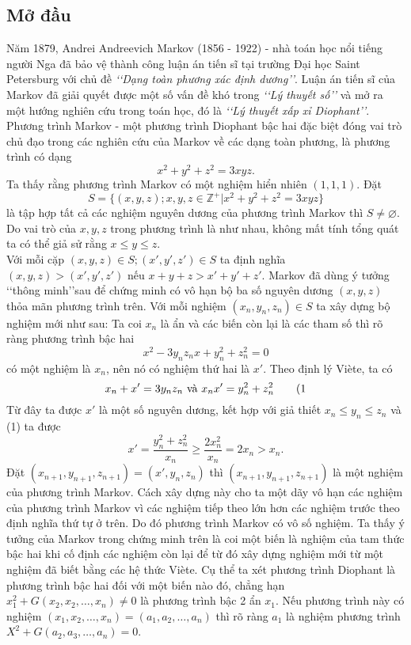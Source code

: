 \subsection{Mở đầu}
Năm 1879, Andrei Andreevich Markov (1856 - 1922) - nhà toán học nổi tiếng người Nga đã bảo vệ thành công luận án tiến sĩ tại trường Đại học Saint Petersburg với chủ đề \textit{{\lq\lq Dạng toàn phương xác định dương\rq\rq}}. Luận án tiến sĩ của Markov đã giải quyết được một số vấn đề khó trong  \textit{{\lq\lq Lý thuyết số\rq\rq}} và mở ra một hướng nghiên cứu trong toán học, đó là \textit{{\lq\lq Lý thuyết xấp xỉ Diophant\rq\rq}}. Phương trình Markov - một phương trình Diophant bậc hai đặc biệt đóng vai trò chủ đạo trong các nghiên cứu của Markov về các dạng toàn phương, là phương trình có dạng 
\[x^2+y^2+z^2=3xyz.\]
Ta thấy rằng phương trình Markov có một nghiệm hiển nhiên $(1,1,1)$. Đặt 
\[S=\{(x,y,z); x,y,z\in \mathbb{Z}^+| x^2+y^2+z^2=3xyz\}\]
là tập hợp tất cả các nghiệm nguyên dương của phương trình Markov thì $S\neq \varnothing.$ Do vai trò của $x,y,z$ trong phương trình là như nhau, không mất tính tổng quát ta có thể giả sử rằng $x\leq y\leq z.$\\
Với mỗi cặp $(x,y,z)\in S; (x', y', z')\in S$ ta định nghĩa $(x,y,z)>(x', y', z')$ nếu $x+y+z>x'+y'+z'.$ Markov đã dùng ý tưởng \lq\lq thông minh\rq\rq sau để chứng minh có vô hạn bộ ba số nguyên dương $(x,y,z)$ thỏa mãn phương trình trên. Với mỗi nghiệm $(x_n, y_n,z_n)\in S$ ta xây dựng bộ nghiệm mới như sau: Ta coi $x_n$ là ẩn và các biến còn lại là các tham số thì rõ ràng phương trình bậc hai
\[x^2- 3y_nz_n x+y_n^2+z_n^2=0\]
có một nghiệm là $x_n$, nên nó có nghiệm thứ hai là $x'$. Theo định lý Viète, ta có
\[x_n+x'=3y_nz_n \text{ và } x_nx'=y_n^2+z_n^2 \tag \label{1}\]
Từ đây ta được $x'$ là một số nguyên dương, kết hợp với giả thiết $x_n\leq y_n \leq z_n$ và (1) ta được
\[x'=\dfrac{y_n^2+z_n^2}{x_n}\geq \dfrac{2x_n^2}{x_n}=2x_n>x_n.\]
Đặt $(x_{n+1},y_{n+1},z_{n+1})=(x',y_n,z_n)$ thì $(x_{n+1},y_{n+1},z_{n+1})$ là một nghiệm của phương trình Markov. Cách xây dựng này cho ta một dãy vô hạn các nghiệm của phương trình Markov vì các nghiệm tiếp theo lớn hơn các nghiệm trước theo định nghĩa thứ tự ở trên. Do đó phương trình Markov có vô số nghiệm. Ta thấy ý tưởng của Markov trong chứng minh trên là coi một biến là nghiệm của tam thức bậc hai khi cố định các nghiệm còn lại để từ đó xây dựng nghiệm mới từ một nghiệm đã biết bằng các hệ thức Viète. Cụ thể ta xét phương trình Diophant là phương trình bậc hai đối với một biến nào đó, chẳng hạn $x_1^2+G(x_2,x_2,\ldots,x_n)\neq 0$ là phương trình bậc 2 ẩn $x_1.$ Nếu phương trình này có nghiệm $(x_1,x_2,\ldots, x_n)=(a_1,a_2,\ldots,a_n)$ thì rõ ràng $a_1$ là nghiệm phương trình $X^2+G(a_2,a_3,\ldots,a_n)=0$. \\

